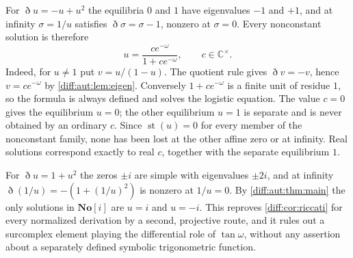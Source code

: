 \documentclass[11pt,letterpaper]{article}
\numberwithin{equation}{section}
\theoremstyle{definition}
\theoremstyle{remark}
\newcommand{\SC}{\mathbf{No}[i]}
\newcommand{\C}{\mathbb C}
\newcommand{\st}{\operatorname{st}}
\newcommand{\Dn}{\eth}
\begin{document}
\begin{example}
\label{diff:aut:ex:logistic}
For $\Dn u=-u+u^{2}$ the equilibria $0$ and $1$ have eigenvalues $-1$ and $+1$,
and at infinity $\sigma=1/u$ satisfies $\Dn\sigma=\sigma-1$, nonzero at
$\sigma=0$. Every nonconstant solution is therefore
\[
 u=\frac{c e^{-\omega}}{1+c e^{-\omega}},\qquad c\in\C^\times.
\]
Indeed, for $u\neq1$ put $v=u/(1-u)$. The quotient rule gives
$\Dn v=-v$, hence $v=c e^{-\omega}$ by
\cref{diff:aut:lem:eigen}. Conversely $1+c e^{-\omega}$ is a
finite unit of residue $1$, so the formula is always defined and
solves the logistic equation. The value $c=0$ gives the equilibrium
$u=0$; the other equilibrium $u=1$ is separate and is never obtained
by an ordinary $c$. Since $\st(u)=0$ for every member of the
nonconstant family, none has been lost at the other affine zero
or at infinity. Real solutions correspond exactly to real $c$,
together with the separate equilibrium $1$.
\end{example}

\begin{example}
\label{diff:aut:ex:riccati}
For $\Dn u=1+u^{2}$ the zeros $\pm i$ are simple with eigenvalues $\pm2i$, and at
infinity $\Dn(1/u)=-(1+(1/u)^{2})$ is nonzero at $1/u=0$. By
\cref{diff:aut:thm:main} the only solutions in $\SC$ are $u=i$ and $u=-i$. This
reproves \cref{diff:cor:riccati} for every normalized derivation by a second,
projective route, and it rules out a surcomplex element playing the differential
role of $\tan\omega$, without any assertion about a separately defined symbolic
trigonometric function.
\end{example}
\end{document}
